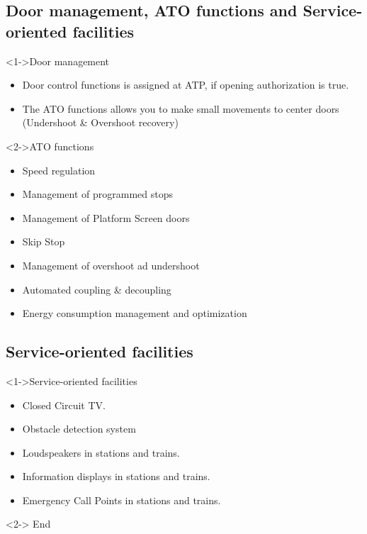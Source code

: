 \subsection{Door management, ATO functions and Service-oriented facilities}
\frame
{
  

\begin{block}<1->{Door management}
\begin{itemize}
\item Door control functions is assigned at ATP, if opening authorization is true.
\item The ATO functions allows you to make small movements to center doors (Undershoot \& Overshoot recovery)
\end{itemize}

   \end{block}
   
   \begin{block}<2->{ATO functions}
   \begin{itemize}
\item Speed regulation
\item Management of programmed stops
\item Management of Platform Screen doors
\item Skip Stop
\item Management of overshoot ad undershoot
\item Automated coupling \& decoupling
\item Energy consumption management and optimization
\end{itemize}
   \end{block}
   
   }



\subsection{Service-oriented facilities}
\frame
{  
   
      \begin{block}<1->{Service-oriented facilities}
      \begin{itemize}
       \item Closed Circuit TV.
\item Obstacle detection system
\item Loudspeakers in stations and trains.
\item Information displays in stations and trains.
\item Emergency Call Points in stations and trains.
\end{itemize}



   \end{block}
   
    \begin{block}<2->{}
   End
   \end{block}
}


